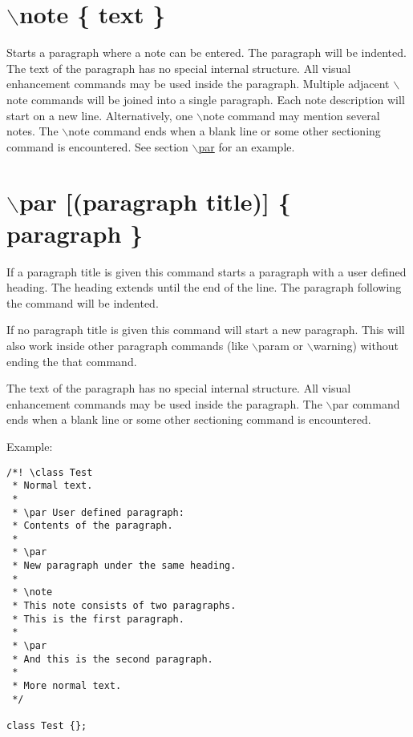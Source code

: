  \hypertarget{commands_cmdnote}{}\section{$\backslash$note \{ text \}}\label{commands_cmdnote}
 Starts a paragraph where a note can be entered. The paragraph will be indented. The text of the paragraph has no special internal structure. All visual enhancement commands may be used inside the paragraph. Multiple adjacent $\backslash$note commands will be joined into a single paragraph. Each note description will start on a new line. Alternatively, one $\backslash$note command may mention several notes. The $\backslash$note command ends when a blank line or some other sectioning command is encountered. See section \hyperlink{commands_cmdpar}{$\backslash$par} for an example.



 \hypertarget{commands_cmdpar}{}\section{$\backslash$par \mbox{[}(paragraph title)\mbox{]} \{ paragraph \}}\label{commands_cmdpar}
 If a paragraph title is given this command starts a paragraph with a user defined heading. The heading extends until the end of the line. The paragraph following the command will be indented.

If no paragraph title is given this command will start a new paragraph. This will also work inside other paragraph commands (like $\backslash$param or $\backslash$warning) without ending the that command.

The text of the paragraph has no special internal structure. All visual enhancement commands may be used inside the paragraph. The $\backslash$par command ends when a blank line or some other sectioning command is encountered.

\begin{Desc}
\item[Example:]

\begin{VerbInclude}\begin{verbatim}/*! \class Test
 * Normal text.
 *
 * \par User defined paragraph:
 * Contents of the paragraph.
 *
 * \par
 * New paragraph under the same heading.
 *
 * \note
 * This note consists of two paragraphs.
 * This is the first paragraph.
 *
 * \par
 * And this is the second paragraph.
 *
 * More normal text. 
 */
  
class Test {};
\end{verbatim}
\end{VerbInclude}
 \end{Desc}


